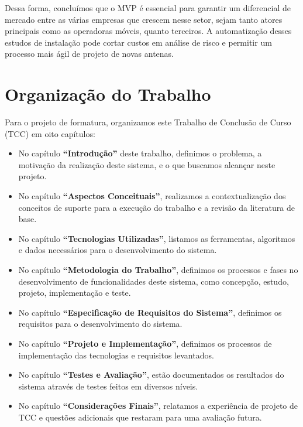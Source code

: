 \documentclass[]{politex}
\begin{document}
Dessa forma, concluímos que o MVP é essencial para garantir um diferencial de
mercado entre as várias empresas que crescem nesse setor, sejam tanto atores
principais como as operadoras móveis, quanto terceiros. A automatização desses
estudos de instalação pode cortar custos em análise de risco e permitir um
processo mais ágil de projeto de novas antenas.

\section{Organização do Trabalho}

Para o projeto de formatura, organizamos este Trabalho de Conclusão de Curso
(TCC) em oito capítulos:

\begin{itemize}

\item No capítulo \textbf{``Introdução''} deste trabalho, definimos o problema,
a motivação da realização deste sistema, e o que buscamos alcançar neste
projeto.

\item No capítulo \textbf{``Aspectos Conceituais''}, realizamos a
contextualização dos conceitos de suporte para a execução do trabalho e a
revisão da literatura de base.

\item No capítulo \textbf{``Tecnologias Utilizadas''}, listamos as ferramentas,
algoritmos e dados necessários para o desenvolvimento do sistema.

\item No capítulo \textbf{``Metodologia do Trabalho''}, definimos os processos e
fases no desenvolvimento de funcionalidades deste sistema, como concepção,
estudo, projeto, implementação e teste.

\item No capítulo \textbf{``Especificação de Requisitos do Sistema''}, definimos
os requisitos para o desenvolvimento do sistema.

\item No capítulo \textbf{``Projeto e Implementação''}, definimos os processos
de implementação das tecnologias e requisitos levantados.

\item No capítulo \textbf{``Testes e Avaliação''}, estão documentados os
resultados do sistema através de testes feitos em diversos níveis.

\item No capítulo \textbf{``Considerações Finais''}, relatamos a experiência de
projeto de TCC e questões adicionais que restaram para uma avaliação futura.

\end{itemize}
\end{document}
